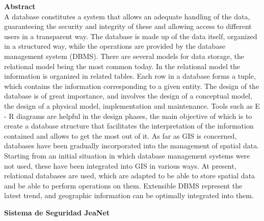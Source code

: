\documentclass[12pt,letterpaper]{article}
\begin{document}
\textbf{Abstract}\\
A database constitutes a system that allows an adequate handling of the data, guaranteeing the security and integrity of these and allowing access to different users in a transparent way. The database is made up of the data itself, organized in a structured way, while the operations are provided by the database management system (DBMS).
There are several models for data storage, the relational model being the most common today. In the relational model the information is organized in related tables. Each row in a database forms a tuple, which contains the information corresponding to a given entity.
The design of the database is of great importance, and involves the design of a conceptual model, the design of a physical model, implementation and maintenance. Tools such as E - R diagrams are helpful in the design phases, the main objective of which is to create a database structure that facilitates the interpretation of the information contained and allows to get the most out of it.
As far as GIS is concerned, databases have been gradually incorporated into the management of spatial data. Starting from an initial situation in which database management systems were not used, these have been integrated into GIS in various ways. At present, relational databases are used, which are adapted to be able to store spatial data and be able to perform operations on them. Extensible DBMS represent the latest trend, and geographic information can be optimally integrated into them.
\\
\newpage
\begin{LARGE}
    \begin{center}
        \textbf{Sistema de Seguridad JeaNet} \\
    \end{center}
\end{LARGE}
\vspace*{0.1in}
\end{document}
